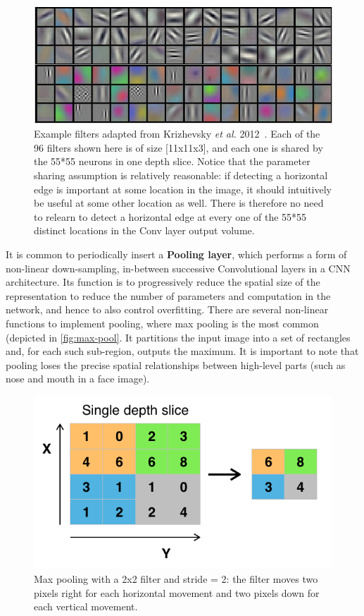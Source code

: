 \begin{figure}[h]
	\centering
	\includegraphics[width=0.9\linewidth]{images/approaches/deep_learning/filters.jpeg}
	\caption{Example filters adapted from Krizhevsky \textit{et al.} 2012~\cite{krizhevsky2012imagenet}.
	Each of the 96 filters shown here is of size [11x11x3], and each one is shared by the 55*55 neurons in one depth slice.
	Notice that the parameter sharing assumption is relatively reasonable: if detecting a horizontal edge is important at some location in the image, it should intuitively be useful at some other location as well.
	There is therefore no need to relearn to detect a horizontal edge at every one of the 55*55 distinct locations in the Conv layer output volume.}
	\label{fig:cnn-filters}
\end{figure}

It is common to periodically insert a \textbf{Pooling layer}, which performs a form of non-linear down-sampling, in-between successive Convolutional layers in a CNN architecture.
Its function is to progressively reduce the spatial size of the representation to reduce the number of parameters and computation in the network, and hence to also control overfitting.
There are several non-linear functions to implement pooling, where max pooling is the most common (depicted in \autoref{fig:max-pool}.
It partitions the input image into a set of rectangles and, for each such sub-region, outputs the maximum.
It is important to note that pooling loses the precise spatial relationships between high-level parts (such as nose and mouth in a face image).

\begin{figure}[h]
	\centering
	\includegraphics[width=0.7\linewidth]{images/approaches/deep_learning/Max_pooling.png}
	\caption{Max pooling with a 2x2 filter and stride = 2: the filter moves two pixels right for each horizontal movement and two pixels down for each vertical movement.}
	\label{fig:max-pool}
\end{figure}


